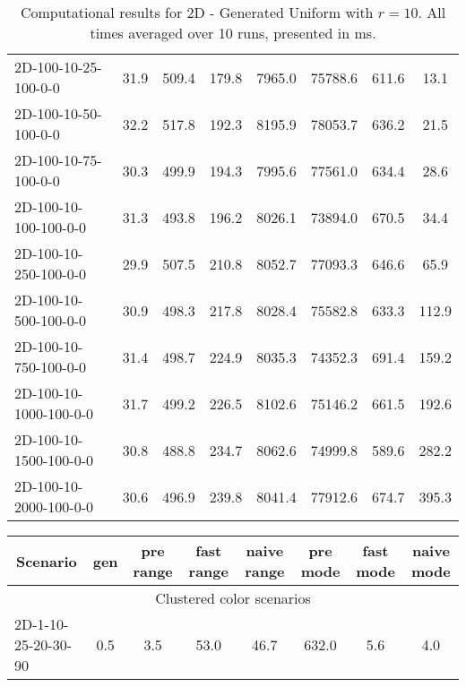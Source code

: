 \documentclass{article}
\begin{document}
\begin{center}
\begin{table}[h]
\begin{tabular}{|l||c|c|c|c|c|c|c|}
            \hline
            2D-100-10-25-100-0-0           & 31.9 & 509.4     & 179.8      & 7965.0      & 75788.6  & 611.6     & 13.1       \\
            2D-100-10-50-100-0-0           & 32.2 & 517.8     & 192.3      & 8195.9      & 78053.7  & 636.2     & 21.5       \\
            2D-100-10-75-100-0-0           & 30.3 & 499.9     & 194.3      & 7995.6      & 77561.0  & 634.4     & 28.6       \\
            2D-100-10-100-100-0-0          & 31.3 & 493.8     & 196.2      & 8026.1      & 73894.0  & 670.5     & 34.4       \\
            2D-100-10-250-100-0-0          & 29.9 & 507.5     & 210.8      & 8052.7      & 77093.3  & 646.6     & 65.9       \\
            2D-100-10-500-100-0-0          & 30.9 & 498.3     & 217.8      & 8028.4      & 75582.8  & 633.3     & 112.9      \\
            2D-100-10-750-100-0-0          & 31.4 & 498.7     & 224.9      & 8035.3      & 74352.3  & 691.4     & 159.2      \\
            2D-100-10-1000-100-0-0         & 31.7 & 499.2     & 226.5      & 8102.6      & 75146.2  & 661.5     & 192.6      \\
            2D-100-10-1500-100-0-0         & 30.8 & 488.8     & 234.7      & 8062.6      & 74999.8  & 589.6     & 282.2      \\
            2D-100-10-2000-100-0-0         & 30.6 & 496.9     & 239.8      & 8041.4      & 77912.6  & 674.7     & 395.3      \\
            \hline
        \end{tabular}
        \caption{Computational results for 2D - Generated Uniform with $r=10$. All times averaged over 10 runs, presented in ms.}
    \end{table}
    \begin{table}[h]
        \hskip0.8cm
        \begin{tabular}{|l||c|c|c|c|c|c|c|}
            \hline
            \multicolumn{1}{|c|}{Scenario} & gen  & pre range & fast range & naive range & pre mode & fast mode & naive mode \\
            \hline
            \hline
            \multicolumn{8}{|c|}{Clustered color scenarios}                                                                  \\
            \hline
            2D-1-10-25-20-30-90            & 0.5  & 3.5       & 53.0       & 46.7        & 632.0    & 5.6       & 4.0        \\

\end{tabular}
\end{table}
\end{center}
\end{document}
